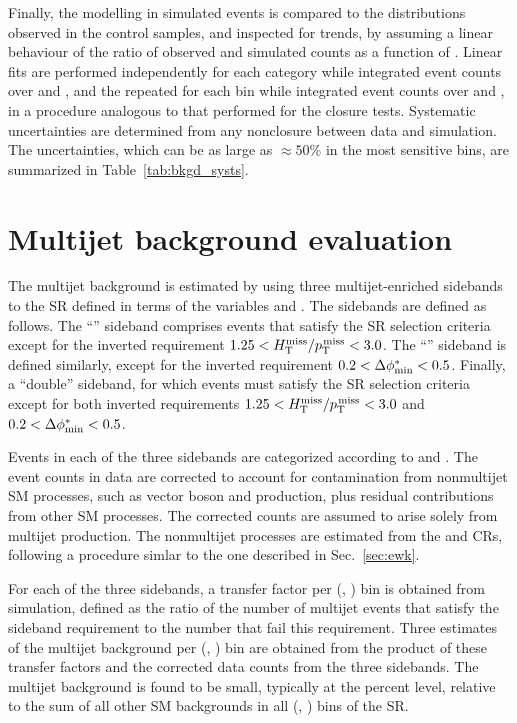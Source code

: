 Finally, the \mht modelling in simulated events is compared to the
distributions observed in the control samples, and inspected for
trends, by assuming a linear behaviour of the ratio of observed and
simulated counts as a function of \mht. Linear fits are performed
independently for each \njet category while integrated event counts
over \nb and \scalht, and the repeated for each \scalht bin while
integrated event counts over \njet and \nb, in a procedure analogous
to that performed for the closure tests. Systematic uncertainties are
determined from any nonclosure between data and simulation. The
uncertainties, which can be as large as ${\approx}50\%$ in the most
sensitive \mht bins, are summarized in Table~\ref{tab:bkgd_systs}.


\section{Multijet background evaluation}
\label{sec:qcd}

The multijet background is estimated by using three multijet-enriched
sidebands to the SR defined in terms of the variables \mhtmet and
\bdphi. The sidebands are defined as follows. The ``\mhtmet'' sideband
comprises events that satisfy the SR selection criteria except for the
inverted requirement $1.25 < H_{\text{T}}^{\text{miss}} / p_{\text{T}}^{\kern1pt\text{miss}} < 3.0$. The ``\bdphi'' sideband
is defined similarly, except for the inverted requirement $0.2 <
\Delta\phi^{*}_\text{min} < 0.5$. Finally, a ``double'' sideband, for which events must
satisfy the SR selection criteria except for both inverted
requirements $1.25 < H_{\text{T}}^{\text{miss}} / p_{\text{T}}^{\kern1pt\text{miss}} < 3.0$ and $0.2 < \Delta\phi^{*}_\text{min} < 0.5$.

Events in each of the three sidebands are categorized according to
\njet and \scalht. The event counts in data are corrected to account
for contamination from nonmultijet SM processes, such as vector boson
and \ttbar production, plus residual contributions from other SM
processes. The corrected counts are assumed to arise solely from
multijet production. The nonmultijet processes are estimated from the
\mj and \mmj CRs, following a procedure simlar to the one described in
Sec.~\ref{sec:ewk}. 

For each of the three sidebands, a transfer factor per (\njet,
\scalht) bin is obtained from simulation, defined as the ratio of the
number of multijet events that satisfy the sideband requirement to the
number that fail this requirement. Three estimates of the multijet
background per (\njet, \scalht) bin are obtained from the product of
these transfer factors and the corrected data counts from the three
sidebands. The multijet background is found to be small, typically at
the percent level, relative to the sum of all other SM backgrounds in
all (\njet, \nb) bins of the SR.

